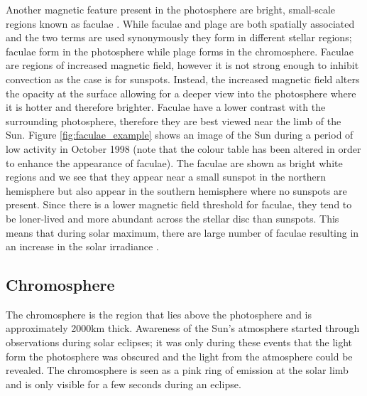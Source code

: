 Another magnetic feature present in the photosphere are bright, small-scale regions known as faculae \citep{Hale_1922}. While faculae and plage are both spatially associated and the two terms are used synonymously they form in different stellar regions; faculae form in the photosphere while plage forms in the chromosphere. Faculae are regions of increased magnetic field, however it is not strong enough to inhibit convection as the case is for sunspots. Instead, the increased magnetic field alters the opacity at the surface allowing for a deeper view into the photosphere where it is hotter and therefore brighter. Faculae have a lower contrast with the surrounding photosphere, therefore they are best viewed near the limb of the Sun. Figure \ref{fig:faculae_example} shows an image of the Sun during a period of low activity in October 1998 (note that the colour table has been altered in order to enhance the appearance of faculae). The faculae are shown as bright white regions and we see that they appear near a small sunspot in the northern hemisphere but also appear in the southern hemisphere where no sunspots are present. Since there is a lower magnetic field threshold for faculae, they tend to be loner-lived and more abundant across the stellar disc than sunspots. This means that during solar maximum, there are large number of faculae resulting in an increase in the solar irradiance \citep{Walton_etal_2003}.

\subsection{Chromosphere}
The chromosphere is the region that lies above the photosphere and is approximately 2000km thick. Awareness of the Sun's atmosphere started through observations during solar eclipses; it was only during these events that the light form the photosphere was obscured and the light from the atmosphere could be revealed. The chromosphere is seen as a pink ring of emission at the solar limb and is only visible for a few seconds during an eclipse.

